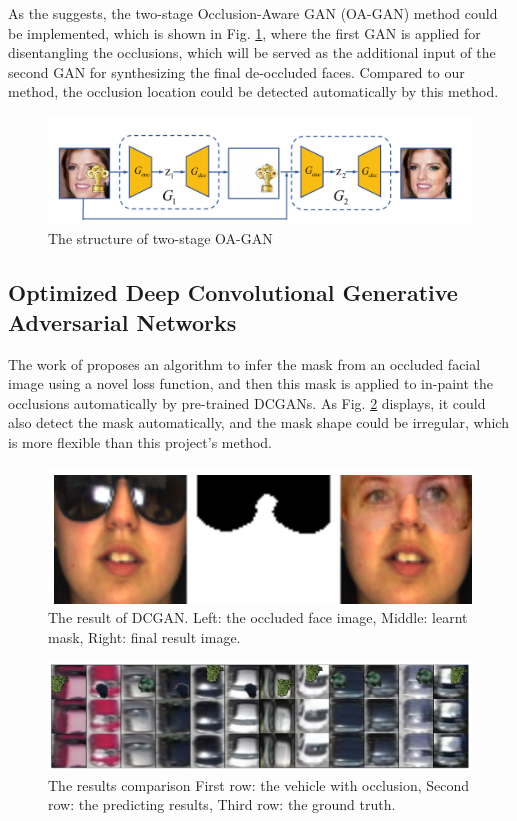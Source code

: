 As the \cite{9102788} suggests, the two-stage Occlusion-Aware GAN (OA-GAN) method could be implemented,  which is shown in Fig. \ref{fig:OA-GAN}, where the first GAN is applied for disentangling the occlusions, which will be served as the additional input of the second GAN for synthesizing the final de-occluded faces. Compared to our method, the occlusion location could be detected automatically by this method.
\begin{figure}[!h]
	\centering
	\includegraphics[width=0.9\linewidth]{contents/OA-GAN.png}
	\caption{The structure of two-stage OA-GAN}
    \label{fig:OA-GAN}
\end{figure}

\subsection{Optimized Deep Convolutional Generative Adversarial Networks}

The work of \cite{8608127} proposes an algorithm to infer the mask from an occluded facial image using a novel loss function, and then this mask is applied to in-paint the occlusions automatically by pre-trained DCGANs. As Fig. \ref{fig:DCGAN} displays, it could also detect the mask automatically, and the mask shape could be irregular, which is more flexible than this project's method.
\begin{figure}[!h]
	\centering
	\includegraphics[width=0.9\linewidth]{contents/DCGAN.png}
	\caption{The result of DCGAN. Left: the occluded face image, Middle: learnt mask, Right: final result image.}
    \label{fig:DCGAN}
\end{figure}
\begin{figure}[!hbt]
	\centering
	\includegraphics[width=0.9\linewidth]{contents/results.png}
	\caption{The results comparison First row: the vehicle with occlusion, Second row: the predicting results, Third row: the ground truth.}
    \label{fig:result}
\end{figure}

